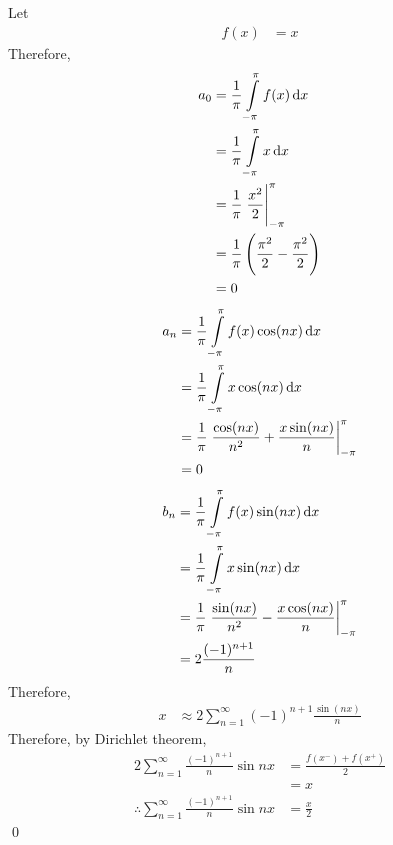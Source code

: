 \documentclass[fleqn, a4paper, 11pt, oneside]{amsart}
\theoremstyle{definition}
\theoremstyle{theorem}
\begin{document}
\begin{solution}
	Let
	\begin{align*}
		f(x) & = x
	\end{align*}
	Therefore,
	\begin{align*}
		a_0 & = \frac{1}{\pi} \int\limits_{-\pi}^{\pi} f(x) \dif x             \\
                    & = \frac{1}{\pi} \int\limits_{-\pi}^{\pi} x \dif x                \\
                    & = \frac{1}{\pi} \left. \frac{x^2}{2} \right|_{-\pi}^{\pi}        \\
                    & = \frac{1}{\pi} \left( \frac{\pi^2}{2} - \frac{\pi^2}{2} \right) \\
                    & = 0
	\end{align*}
	\begin{align*}
		a_n & = \frac{1}{\pi} \int\limits_{-\pi}^{\pi} f(x) \cos(n x) \dif x                            \\
                    & = \frac{1}{\pi} \int\limits_{-\pi}^{\pi} x \cos(n x) \dif x                               \\
                    & = \frac{1}{\pi} \left. \frac{\cos(n x)}{n^2} + \frac{x \sin(n x)}{n} \right|_{-\pi}^{\pi} \\
                    & = 0
	\end{align*}
	\begin{align*}
		b_n & = \frac{1}{\pi} \int\limits_{-\pi}^{\pi} f(x) \sin(n x) \dif x                            \\
                    & = \frac{1}{\pi} \int\limits_{-\pi}^{\pi} x \sin(n x) \dif x                               \\
                    & = \frac{1}{\pi} \left. \frac{\sin(n x)}{n^2} - \frac{x \cos(n x)}{n} \right|_{-\pi}^{\pi} \\
                    & = 2 \frac{(-1)^{n + 1}}{n}
	\end{align*}
	Therefore,
	\begin{align*}
		x & \approx 2 \sum\limits_{n = 1}^{\infty} (-1)^{n + 1} \frac{\sin(n x)}{n}
	\end{align*}
	Therefore, by Dirichlet theorem,
	\begin{align*}
		2 \sum\limits_{n = 1}^{\infty} \frac{(-1)^{n + 1}}{n} \sin n x          & = \frac{f(x^-) + f(x^+)}{2} \\
                                                                                        & = x                         \\
		\therefore \sum\limits_{n = 1}^{\infty} \frac{(-1)^{n + 1}}{n} \sin n x & = \frac{x}{2}
	\end{align*}
	\qed
\end{solution}
\end{document}
